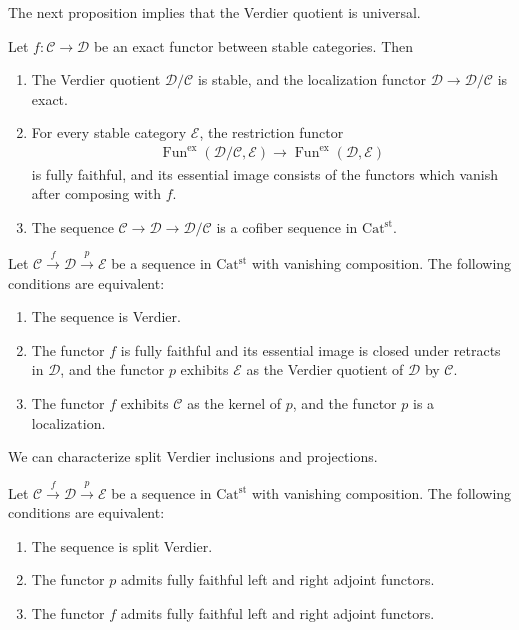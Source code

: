 \documentclass[a4paper,dvipdfmx,11pt,reqno]{amsart}
\DeclareMathOperator{\Fun}{Fun}
\newcommand{\C}{\mathcal{C}}
\newcommand{\D}{\mathcal{D}}
\newcommand{\E}{\mathcal{E}}
\newcommand{\Catst}{\mathrm{Cat^{st}}}
\begin{document}
The next proposition implies that the Verdier quotient is universal.

\begin{proposition}
  Let $f : \C \to \D$ be an exact functor between stable categories.
  Then
  \begin{enumerate}
    \item The Verdier quotient $\D/\C$ is stable, and the localization functor $\D \to \D/\C$ is exact.
    \item For every stable category $\E$, the restriction functor
    \begin{align*}
      \Fun^{\mathrm{ex}}(\D/\C,\E) \to \Fun^{\mathrm{ex}}(\D,\E)
    \end{align*}
    is fully faithful, and its essential image consists of the functors which vanish after composing with $f$.
    \item The sequence $\C \to \D \to \D/\C$ is a cofiber sequence in $\Catst$.
  \end{enumerate} 
\end{proposition}

\begin{proposition}
  Let $\C \xrightarrow{f} \D \xrightarrow{p} \E$ be a sequence in $\Catst$ with vanishing composition.
  The following conditions are equivalent:
  \begin{enumerate}
    \item The sequence is Verdier.
    \item The functor $f$ is fully faithful and its essential image is closed under retracts in $\D$, and the functor $p$ exhibits $\E$ as the Verdier quotient of $\D$ by $\C$.
    \item The functor $f$ exhibits $\C$ as the kernel of $p$, and the functor $p$ is a localization.
  \end{enumerate}
\end{proposition}

We can characterize split Verdier inclusions and projections.

\begin{proposition} %
  Let $\C \xrightarrow{f} \D \xrightarrow{p} \E$ be a sequence in $\Catst$ with vanishing composition.
  The following conditions are equivalent:
  \begin{enumerate}
    \item The sequence is split Verdier.
    \item The functor $p$ admits fully faithful left and right adjoint functors.
    \item The functor $f$ admits fully faithful left and right adjoint functors.
  \end{enumerate}
\end{proposition}
\end{document}
